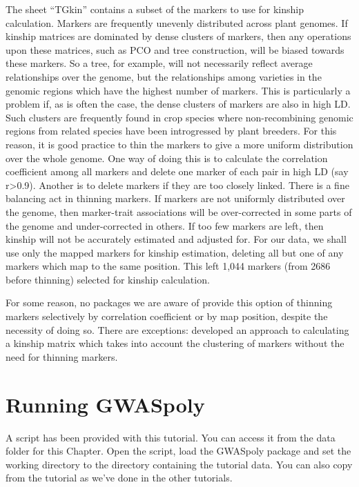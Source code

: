 \documentclass[
]{book}
\makeatletter
\newenvironment{kframe}{%
\medskip{}
\setlength{\fboxsep}{.8em}
 \def\at@end@of@kframe{}%
 \ifinner\ifhmode%
  \def\at@end@of@kframe{\end{minipage}}%
  \begin{minipage}{\columnwidth}%
 \fi\fi%
 \def\FrameCommand##1{\hskip\@totalleftmargin \hskip-\fboxsep
 \colorbox{shadecolor}{##1}\hskip-\fboxsep
     \hskip-\linewidth \hskip-\@totalleftmargin \hskip\columnwidth}%
 \MakeFramed {\advance\hsize-\width
   \@totalleftmargin\z@ \linewidth\hsize
   \@setminipage}}%
 {\par\unskip\endMakeFramed%
 \at@end@of@kframe}
\newenvironment{rmdblock}[1]
  {
  \begin{itemize}
  \renewcommand{\labelitemi}{
    \raisebox{-.7\height}[0pt][0pt]{
      {\setkeys{Gin}{width=3em,keepaspectratio}\texttt{[image: images/\#1]}}
    }
  }
  \setlength{\fboxsep}{1em}
  \begin{kframe}
  \item
  }
  {
  \end{kframe}
  \end{itemize}
  }
\newenvironment{rmdnote}
  {\begin{rmdblock}{note}}
  {\end{rmdblock}}
\makeatother
\begin{document}
The sheet ``TGkin'' contains a subset of the markers to use for kinship calculation. Markers are frequently unevenly distributed across plant genomes. If kinship matrices are dominated by dense clusters of markers, then any operations upon these matrices, such as PCO and tree construction, will be biased towards these markers. So a tree, for example, will not necessarily reflect average relationships over the genome, but the relationships among varieties in the genomic regions which have the highest number of markers. This is particularly a problem if, as is often the case, the dense clusters of markers are also in high LD. Such clusters are frequently found in crop species where non-recombining genomic regions from related species have been introgressed by plant breeders. For this reason, it is good practice to thin the markers to give a more uniform distribution over the whole genome. One way of doing this is to calculate the correlation coefficient among all markers and delete one marker of each pair in high LD (say r\textgreater0.9). Another is to delete markers if they are too closely linked. There is a fine balancing act in thinning markers. If markers are not uniformly distributed over the genome, then marker-trait associations will be over-corrected in some parts of the genome and under-corrected in others. If too few markers are left, then kinship will not be accurately estimated and adjusted for. For our data, we shall use only the mapped markers for kinship estimation, deleting all but one of any markers which map to the same position. This left 1,044 markers (from 2686 before thinning) selected for kinship calculation.

For some reason, no packages we are aware of provide this option of thinning markers selectively by correlation coefficient or by map position, despite the necessity of doing so. There are exceptions: \citet{speed2012} developed an approach to calculating a kinship matrix which takes into account the clustering of markers without the need for thinning markers.

\hypertarget{running-gwaspoly}{%
\section{Running GWASpoly}\label{running-gwaspoly}}

\begin{rmdnote}
A script has been provided with this tutorial. You can access it from the data folder for this Chapter. Open the script, load the GWASpoly package and set the working directory to the directory containing the tutorial data. You can also copy from the tutorial as we've done in the other tutorials.
\end{rmdnote}
\end{document}
